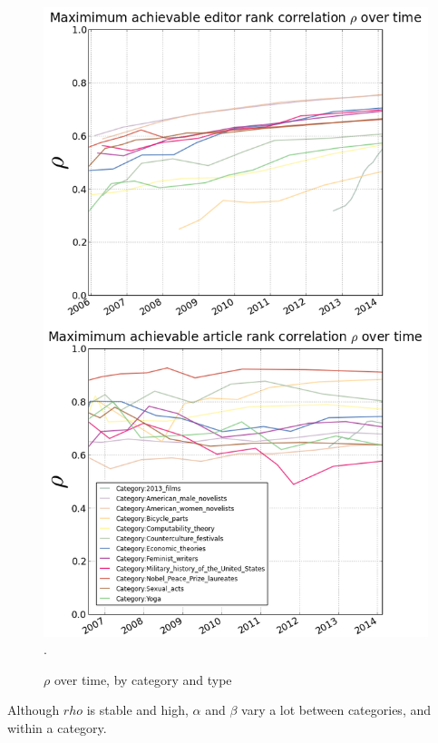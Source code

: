 \documentclass{acm_proc_article-sp}
\begin{document}
\begin{figure}[!t]
\centering
\includegraphics[width=0.9\columnwidth]{rho_combined.png}.
\caption{$\rho$ over time, by category and type}
\label{fig:rhotime}
\end{figure}


Although $rho$ is stable and high, $\alpha$ and $\beta$ vary a lot between categories, and within a category. 


\end{document}
